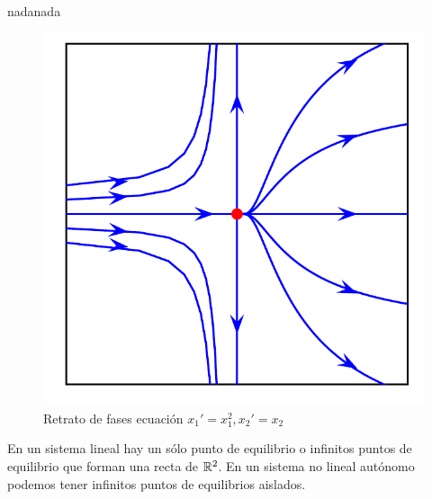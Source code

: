 \begin{ejemplo}{nadanada}
\begin{figure}[h]
\begin{center}
\includegraphics[scale=.3]{imagenes/RetraFasesMixto.png}
\caption{Retrato de fases ecuación $x_1'=x_1^2,
x_2'=x_2$}\label{sisdegen}
\end{center}
\end{figure}

\end{ejemplo}




En un sistema lineal hay un sólo punto de equilibrio o infinitos
puntos de equilibrio que forman una recta de $\mathbb{R}^2$. En un
sistema no lineal autónomo podemos tener infinitos puntos de
equilibrios aislados.

